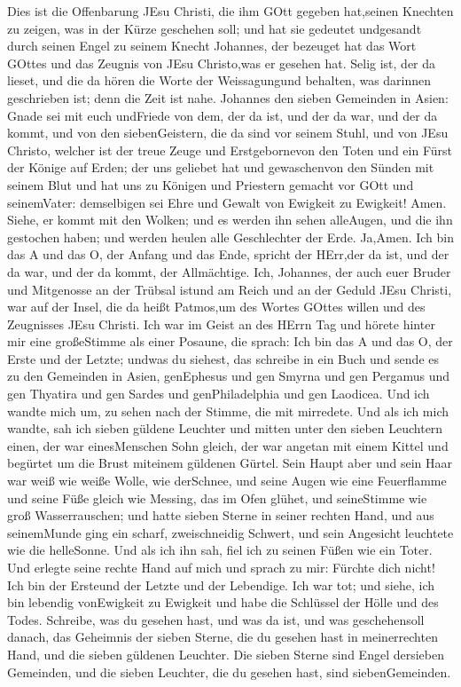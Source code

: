  Dies ist die Offenbarung JEsu Christi, die ihm GOtt gegeben
hat,seinen Knechten zu zeigen, was in der Kürze geschehen soll; und hat
sie gedeutet undgesandt durch seinen Engel zu seinem Knecht Johannes,
 der bezeuget hat das Wort GOttes und das Zeugnis von JEsu
Christo,was er gesehen hat.  Selig ist, der da lieset, und
die da hören die Worte der Weissagungund behalten, was darinnen
geschrieben ist; denn die Zeit ist nahe.  Johannes den
sieben Gemeinden in Asien: Gnade sei mit euch undFriede von dem, der da
ist, und der da war, und der da kommt, und von den siebenGeistern, die
da sind vor seinem Stuhl,  und von JEsu Christo, welcher ist
der treue Zeuge und Erstgebornevon den Toten und ein Fürst der Könige
auf Erden; der uns geliebet hat und gewaschenvon den Sünden mit seinem
Blut  und hat uns zu Königen und Priestern gemacht vor GOtt
und seinemVater: demselbigen sei Ehre und Gewalt von Ewigkeit zu
Ewigkeit! Amen.  Siehe, er kommt mit den Wolken; und es
werden ihn sehen alleAugen, und die ihn gestochen haben; und werden
heulen alle Geschlechter der Erde. Ja,Amen.  Ich bin das A
und das O, der Anfang und das Ende, spricht der HErr,der da ist, und der
da war, und der da kommt, der Allmächtige.  Ich, Johannes,
der auch euer Bruder und Mitgenosse an der Trübsal istund am Reich und
an der Geduld JEsu Christi, war auf der Insel, die da heißt Patmos,um
des Wortes GOttes willen und des Zeugnisses JEsu Christi. 
Ich war im Geist an des HErrn Tag und hörete hinter mir eine großeStimme
als einer Posaune,  die sprach: Ich bin das A und das O,
der Erste und der Letzte; undwas du siehest, das schreibe in ein Buch
und sende es zu den Gemeinden in Asien, genEphesus und gen Smyrna und
gen Pergamus und gen Thyatira und gen Sardes und genPhiladelphia und gen
Laodicea.  Und ich wandte mich um, zu sehen nach der
Stimme, die mit mirredete. Und als ich mich wandte, sah ich sieben
güldene Leuchter  und mitten unter den sieben Leuchtern
einen, der war einesMenschen Sohn gleich, der war angetan mit einem
Kittel und begürtet um die Brust miteinem güldenen Gürtel. 
Sein Haupt aber und sein Haar war weiß wie weiße Wolle, wie derSchnee,
und seine Augen wie eine Feuerflamme  und seine Füße gleich
wie Messing, das im Ofen glühet, und seineStimme wie groß
Wasserrauschen;  und hatte sieben Sterne in seiner rechten
Hand, und aus seinemMunde ging ein scharf, zweischneidig Schwert, und
sein Angesicht leuchtete wie die helleSonne.  Und als ich
ihn sah, fiel ich zu seinen Füßen wie ein Toter. Und erlegte seine
rechte Hand auf mich und sprach zu mir: Fürchte dich nicht! Ich bin der
Ersteund der Letzte  und der Lebendige. Ich war tot; und
siehe, ich bin lebendig vonEwigkeit zu Ewigkeit und habe die Schlüssel
der Hölle und des Todes.  Schreibe, was du gesehen hast,
und was da ist, und was geschehensoll danach,  das
Geheimnis der sieben Sterne, die du gesehen hast in meinerrechten Hand,
und die sieben güldenen Leuchter. Die sieben Sterne sind Engel dersieben
Gemeinden, und die sieben Leuchter, die du gesehen hast, sind
siebenGemeinden.

